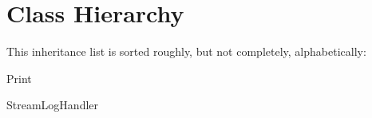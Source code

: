\section{Class Hierarchy}
This inheritance list is sorted roughly, but not completely, alphabetically\+:\begin{DoxyCompactList}
\item Print\begin{DoxyCompactList}
\item {}
\begin{DoxyCompactList}
\item {}
\end{DoxyCompactList}
\end{DoxyCompactList}
\item Stream\+Log\+Handler\begin{DoxyCompactList}
\item {}
\end{DoxyCompactList}
\end{DoxyCompactList}
